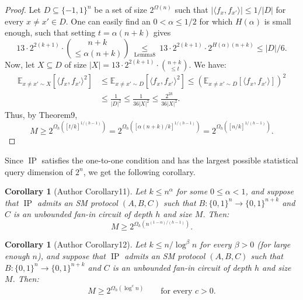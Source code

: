 \documentclass[10pt,a4paper]{article}
\newtheorem{ntcorollary}[nttheorem]{Corollary}
\begin{document}
\begin{proof}
Let $D\subseteq\{-1,1\}^n$ be a set of size $2^{\Omega(n)}$ such that $|\langle f_x,f_{x'}\rangle|\leq1/|D|$ for every $x\ne x'\in D$. One can easily find an $0<\alpha\leq1/2$ for which $H(\alpha)$ is small enough, such that setting $t=\alpha(n+k)$ gives
\[13\cdot2^{2(k+1)}\cdot\binom{n+k}{\leq\alpha(n+k)}\ \underset{\text{Lemma8}}\leq\ 13\cdot2^{2(k+1)}\cdot2^{H(\alpha)(n+k)}\leq|D|/6.\]
Now, let $X\subseteq D$ of size $|X|=13\cdot2^{2(k+1)}\cdot\binom{n+k}{\leq t}$. We have:
\begin{align*}\mathbb E_{x\ne x'\sim X}[\langle f_x,f_{x'}\rangle^2]&\leq\mathbb E_{x\ne x'\sim D}[\langle f_x,f_{x'}\rangle^2]\leq\left(\mathbb E_{x\ne x'\sim D}[\langle f_x,f_{x'}\rangle]\right)^2\\&\leq\frac1{|D|^2}\leq\frac1{36|X|^2}\leq\frac{2^{2k}}{36|X|^2}.\end{align*}
Thus, by Theorem9,
\[M\geq2^{\Omega_h([t/k]^{1/(h-1)})}=2^{\Omega_h([\alpha(n+k)/k]^{1/(h-1)})}=2^{\Omega_h([n/k]^{1/(h-1)})}.\]
\end{proof}
Since $\operatorname{IP}$ satisfies the one-to-one condition and has the largest possible statistical query dimension of $2^n$, we get the following corollary.
\begin{ntcorollary}[Author Corollary11]
Let $k\leq n^\alpha$ for some $0\leq\alpha<1$, and suppose that $\operatorname{IP}$ admits an SM protocol $(A,B,C)$ such that $B:\{0,1\}^n\to\{0,1\}^{n+k}$ and $C$ is an unbounded fan-in circuit of depth $h$ and size $M$. Then:
\[M\geq2^{\Omega_h(n^{(1-\alpha)/(h-1)})}.\]
\end{ntcorollary}
\begin{ntcorollary}[Author Corollary12]
Let $k\leq n/\log^\beta n$ for every $\beta>0$ (for large enough $n$), and suppose that $\operatorname{IP}$ admits an SM protocol $(A,B,C)$ such that $B:\{0,1\}^n\to\{0,1\}^{n+k}$ and $C$ is an unbounded fan-in circuit of depth $h$ and size $M$. Then:
\[M\geq2^{\Omega_h(\log^c n)}\qquad\text{for every }c>0.\]
\end{ntcorollary}
\end{document}
